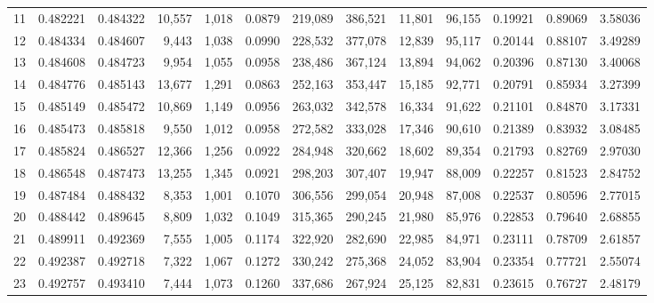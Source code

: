 \begin{tabular}{rrrrrrrrrrrrr}
11 &  0.482221 &  0.484322 &  10,557 &  1,018 &                                     0.0879 &  219,089 &  386,521 &   11,801 &   96,155 &  0.19921 &  0.89069 &  3.58036 \\
12 &  0.484334 &  0.484607 &   9,443 &  1,038 &                                     0.0990 &  228,532 &  377,078 &   12,839 &   95,117 &  0.20144 &  0.88107 &  3.49289 \\
13 &  0.484608 &  0.484723 &   9,954 &  1,055 &                                     0.0958 &  238,486 &  367,124 &   13,894 &   94,062 &  0.20396 &  0.87130 &  3.40068 \\
14 &  0.484776 &  0.485143 &  13,677 &  1,291 &                                     0.0863 &  252,163 &  353,447 &   15,185 &   92,771 &  0.20791 &  0.85934 &  3.27399 \\
15 &  0.485149 &  0.485472 &  10,869 &  1,149 &                                     0.0956 &  263,032 &  342,578 &   16,334 &   91,622 &  0.21101 &  0.84870 &  3.17331 \\
16 &  0.485473 &  0.485818 &   9,550 &  1,012 &                                     0.0958 &  272,582 &  333,028 &   17,346 &   90,610 &  0.21389 &  0.83932 &  3.08485 \\
17 &  0.485824 &  0.486527 &  12,366 &  1,256 &                                     0.0922 &  284,948 &  320,662 &   18,602 &   89,354 &  0.21793 &  0.82769 &  2.97030 \\
18 &  0.486548 &  0.487473 &  13,255 &  1,345 &                                     0.0921 &  298,203 &  307,407 &   19,947 &   88,009 &  0.22257 &  0.81523 &  2.84752 \\
19 &  0.487484 &  0.488432 &   8,353 &  1,001 &                                     0.1070 &  306,556 &  299,054 &   20,948 &   87,008 &  0.22537 &  0.80596 &  2.77015 \\
20 &  0.488442 &  0.489645 &   8,809 &  1,032 &                                     0.1049 &  315,365 &  290,245 &   21,980 &   85,976 &  0.22853 &  0.79640 &  2.68855 \\
21 &  0.489911 &  0.492369 &   7,555 &  1,005 &                                     0.1174 &  322,920 &  282,690 &   22,985 &   84,971 &  0.23111 &  0.78709 &  2.61857 \\
22 &  0.492387 &  0.492718 &   7,322 &  1,067 &                                     0.1272 &  330,242 &  275,368 &   24,052 &   83,904 &  0.23354 &  0.77721 &  2.55074 \\
23 &  0.492757 &  0.493410 &   7,444 &  1,073 &                                     0.1260 &  337,686 &  267,924 &   25,125 &   82,831 &  0.23615 &  0.76727 &  2.48179 \\

\end{tabular}
